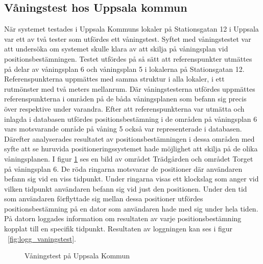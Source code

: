 \documentclass[a4paper,12pt]{article}
\begin{document}
 \subsection{Våningstest hos Uppsala kommun}\label{vaningstest}
 När systemet testades i Uppsala Kommuns lokaler på Stationsgatan 12 i Uppsala var ett av två tester som utfördes ett våningstest. Syftet med våningstestet var att undersöka om systemet skulle klara av att skilja på våningsplan vid positionsbestämningen. Testet utfördes på så sätt att referenspunkter utmättes på delar av våningsplan 6 och våningsplan 5 i lokalerna på Stationsgatan 12. Referenspunkterna uppmättes med samma struktur i alla lokaler, i ett rutmönster med två meters mellanrum. Där våningstesterna utfördes uppmättes referenspunkterna i områden på de båda våningsplanen som befann sig precis över respektive under varandra. Efter att referenspunkterna var utmätta och inlagda i databasen utfördes positionsbestämning i de områden på våningsplan 6 vars motsvarande område på våning 5 också var representerade i databasen. Därefter analyserades resultatet av positionsbestämningen i dessa områden med syfte att se huruvida positioneringssystemet hade möjlighet att skilja på de olika våningsplanen. I figur \ref{fig:vanings_test} ses en bild av området Trädgården och området Torget på våningsplan 6. De röda ringarna motsvarar de positioner där användaren befann sig vid en viss tidpunkt. Under ringarna visas ett klockslag som anger vid vilken tidpunkt användaren befann sig vid just den positionen. Under den tid som användaren förflyttade sig mellan dessa positioner utfördes positionsbestämning på en dator som användaren hade med sig under hela tiden. På datorn loggades information om resultaten av varje positionsbestämning kopplat till en specifik tidpunkt. Resultaten av loggningen kan ses i figur ~\ref{fig:logg_vaningstest}.

 \begin{figure}[H]
   \centering
   \caption{Våningstest på Uppsala Kommun}
   \label{fig:vanings_test}
 \end{figure}
\end{document}
